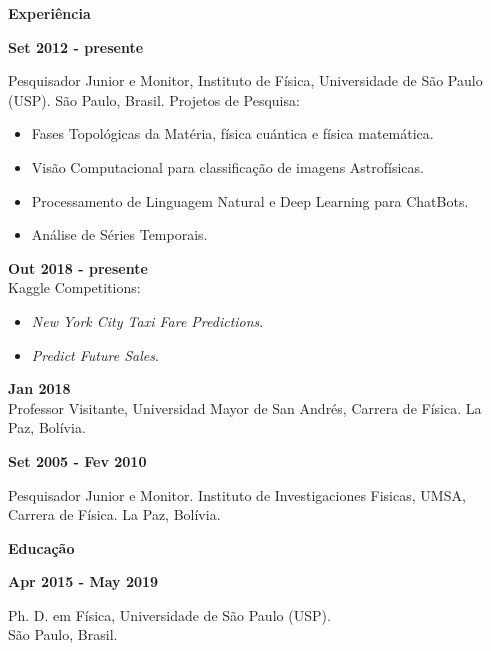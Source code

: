 \documentclass[a4paper,12pt,final]{memoir}
\newcommand{\SmallSep}{\vspace{0.5em}}
\newcommand{\CVSection}[1]
	{\Large\textbf{#1}\par
	\SmallSep\normalsize\normalfont}
\newcommand{\CVItem}[1]
	{\textbf{\color{RoyalBlue} #1}}
\begin{document}
\vspace{-20pt} 
\CVSection{Experiência}
\CVItem{Set 2012 - presente}\\
\begin{small}
Pesquisador Junior e Monitor,  Instituto de F\'{i}sica, Universidade de S\~{a}o Paulo 
(USP). S\~{a}o Paulo, Brasil. 
Projetos de Pesquisa: 
\end{small}
\begin{footnotesize}
\begin{itemize}[noitemsep,topsep=0pt,parsep=0pt,partopsep=0pt]
\item Fases Topológicas da Matéria, física cuántica e física matemática.
\item Visão Computacional para classificação de imagens Astrofísicas.
\item Processamento de Linguagem Natural e Deep Learning para ChatBots.
\item Análise de Séries Temporais.
\end{itemize}
\end{footnotesize}

\SmallSep

\CVItem{Out 2018 - presente}\\
{\small Kaggle Competitions:}
\begin{footnotesize}
\begin{itemize}[noitemsep,topsep=0pt,parsep=0pt,partopsep=0pt]
\item \emph{New York City Taxi Fare Predictions}.
\item \emph{Predict Future Sales}.
\end{itemize}
\end{footnotesize}
\SmallSep


\CVItem{Jan 2018}\\
{\small Professor Visitante, Universidad Mayor de San Andr\'{e}s, Carrera de Física. La Paz, Bolívia.}
\SmallSep

\CVItem{Set 2005 - Fev 2010}\\
\begin{small}
Pesquisador Junior e Monitor. Instituto de Investigaciones Fisicas,
UMSA, Carrera de Física. La Paz, Bolívia. 
\end{small}

\SmallSep

\CVSection{Educação}
\CVItem{Apr 2015 - May 2019}\\
\begin{small}
 Ph. D. em Física, Universidade de S\~{a}o Paulo (USP).\\ 
S\~{a}o Paulo, Brasil.
 \end{small} 
\SmallSep
\end{document}
